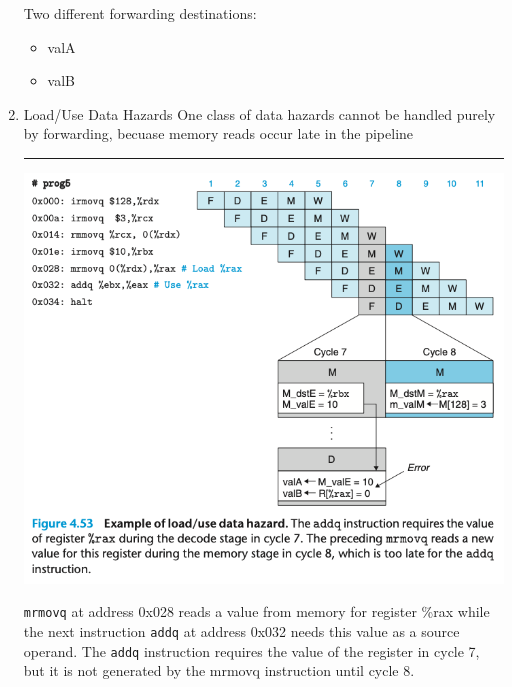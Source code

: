 \documentclass[11pt]{article}
\begin{document}
\begin{enumerate}
Two different forwarding destinations:\\
\begin{itemize}
\item valA\\
\item valB\\
\end{itemize}


\item Load/Use Data Hazards
\label{sec:orgb8a224a}
One class of data hazards cannot be handled purely by forwarding, becuase memory reads occur late in the pipeline\\

\noindent\rule{\textwidth}{0.5pt}

\begin{center}
\includegraphics[width=.9\linewidth]{pics/figure4.53-example-of-load:use-data-hazard.png}
\end{center}


\texttt{mrmovq} at address 0x028 reads a value from memory for register \%rax while the next instruction \texttt{addq} at address 0x032 needs this value as a source operand. The \texttt{addq} instruction requires the value of the register in cycle 7, but it is not generated by the mrmovq instruction until cycle 8.\\


\end{enumerate}
\end{document}
